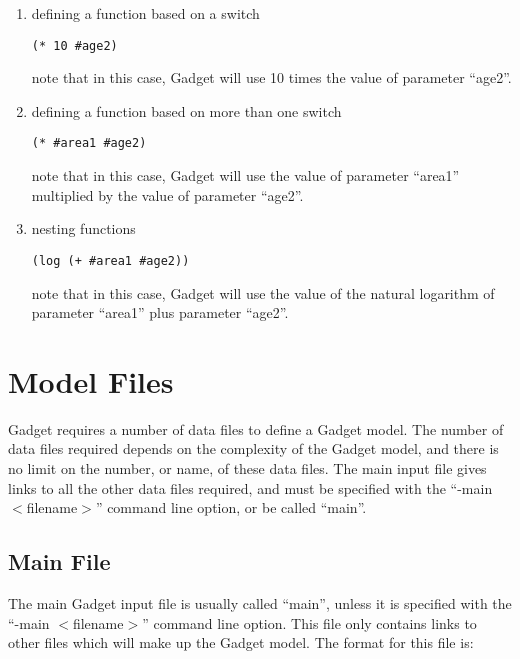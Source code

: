 \documentclass[]{book}
\begin{document}
\begin{enumerate}
\def\labelenumi{\arabic{enumi}.}
\item
  defining a function based on a switch

\begin{verbatim}
(* 10 #age2)
\end{verbatim}

  note that in this case, Gadget will use 10 times the value of
  parameter ``age2''.
\item
  defining a function based on more than one switch

\begin{verbatim}
(* #area1 #age2)
\end{verbatim}

  note that in this case, Gadget will use the value of parameter
  ``area1'' multiplied by the value of parameter ``age2''.
\item
  nesting functions

\begin{verbatim}
(log (+ #area1 #age2))
\end{verbatim}

  note that in this case, Gadget will use the value of the natural
  logarithm of parameter ``area1'' plus parameter ``age2''.
\end{enumerate}

\hypertarget{chap:model}{%
\chapter{Model Files}\label{chap:model}}

Gadget requires a number of data files to define a Gadget model. The
number of data files required depends on the complexity of the Gadget
model, and there is no limit on the number, or name, of these data
files. The main input file gives links to all the other data files
required, and must be specified with the ``-main \(<\)filename\(>\)'' command
line option, or be called ``main''.

\hypertarget{sec:mainfile}{%
\section{Main File}\label{sec:mainfile}}

The main Gadget input file is usually called ``main'', unless it is
specified with the ``-main \(<\)filename\(>\)'' command line option. This file
only contains links to other files which will make up the Gadget model.
The format for this file is:
\end{document}

